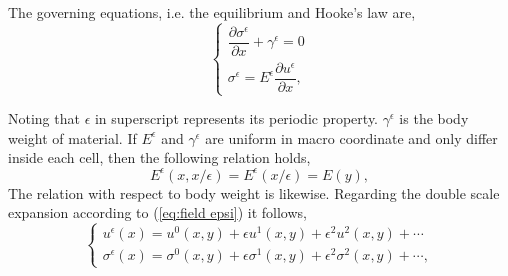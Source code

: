 \documentclass[10pt,a4paper]{scrreprt}
\begin{document}
The governing equations, i.e. the equilibrium and Hooke's law are,
\begin{equation}
\left\{
\begin{array}{l}
\dfrac{\partial \sigma^{\epsilon}}{\partial x} + \gamma^{\epsilon} = 0 \\
\sigma^{\epsilon} = E^{\epsilon} \dfrac{\partial u^{\epsilon}}{\partial x},
\end{array}
\right.
\end{equation}

Noting that $\epsilon$ in superscript represents its periodic property. $\gamma^{\epsilon}$ is the body weight of material. If $E^{\epsilon}$ and $\gamma^{\epsilon}$ are uniform in macro coordinate and only differ inside each cell, then the following relation holds,
\begin{equation}
E^{\epsilon}(x,x/\epsilon)=E^{\epsilon}(x/\epsilon)=E(y),
\end{equation}
The relation with respect to body weight is likewise. Regarding the double scale expansion according to (\ref{eq:field epsi}) it follows,
\begin{equation}
\left\{
\begin{array}{l}
u^{\epsilon}(x) = u^{0}(x,y) + \epsilon u^{1}(x,y) + \epsilon^{2} u^{2}(x,y) + \cdots \\
\sigma^{\epsilon}(x) = \sigma^{0}(x,y) + \epsilon \sigma^{1}(x,y) + \epsilon^{2} \sigma^{2}(x,y) + \cdots,
\end{array}
\right.
\end{equation}
\end{document}
